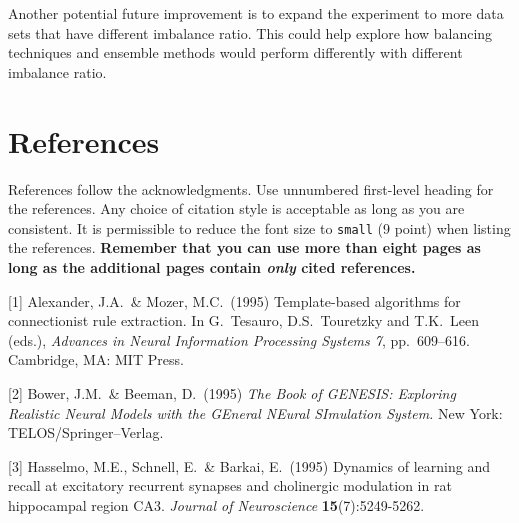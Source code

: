 \documentclass{article}
\begin{document}
Another potential future improvement is to expand the experiment to more data sets that have different imbalance ratio. This could help explore how balancing techniques and ensemble methods would perform differently with different imbalance ratio.

\section*{References}

References follow the acknowledgments. Use unnumbered first-level heading for
the references. Any choice of citation style is acceptable as long as you are
consistent. It is permissible to reduce the font size to \verb+small+ (9 point)
when listing the references. {\bf Remember that you can use more than eight
  pages as long as the additional pages contain \emph{only} cited references.}
\medskip

\small

[1] Alexander, J.A.\ \& Mozer, M.C.\ (1995) Template-based algorithms for
connectionist rule extraction. In G.\ Tesauro, D.S.\ Touretzky and T.K.\ Leen
(eds.), {\it Advances in Neural Information Processing Systems 7},
pp.\ 609--616. Cambridge, MA: MIT Press.

[2] Bower, J.M.\ \& Beeman, D.\ (1995) {\it The Book of GENESIS: Exploring
  Realistic Neural Models with the GEneral NEural SImulation System.}  New York:
TELOS/Springer--Verlag.

[3] Hasselmo, M.E., Schnell, E.\ \& Barkai, E.\ (1995) Dynamics of learning and
recall at excitatory recurrent synapses and cholinergic modulation in rat
hippocampal region CA3. {\it Journal of Neuroscience} {\bf 15}(7):5249-5262.
\end{document}
